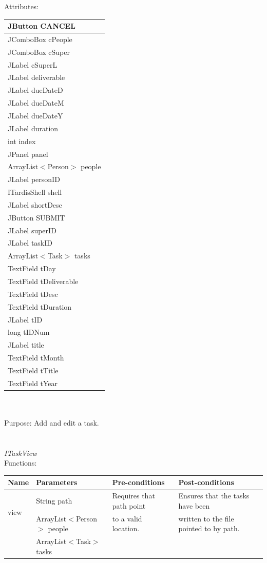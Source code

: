 Attributes:\\
\begin{tabular}{| l |}
\hline
JButton CANCEL\\
\hline
JComboBox cPeople\\
\hline
JComboBox cSuper\\
\hline
JLabel cSuperL\\
\hline
JLabel deliverable\\
\hline
JLabel dueDateD\\
\hline
JLabel dueDateM\\
\hline
JLabel dueDateY\\
\hline
JLabel duration\\
\hline
int index\\
\hline
JPanel panel\\
\hline
ArrayList$<$Person$>$ people\\
\hline
JLabel personID\\
\hline
ITardisShell shell\\
\hline
JLabel shortDesc\\
\hline
JButton SUBMIT\\
\hline
JLabel superID\\
\hline
JLabel taskID\\
\hline
ArrayList$<$Task$>$ tasks\\
\hline
TextField tDay\\
\hline
TextField tDeliverable\\
\hline
TextField tDesc\\
\hline
TextField tDuration\\
\hline
JLabel tID\\
\hline
long tIDNum\\
\hline
JLabel title\\
\hline
TextField tMonth\\
\hline
TextField tTitle\\
\hline
TextField tYear\\
\hline
\end{tabular}\\
\\
Purpose: Add and edit a task.\\
\\
\\
\emph{ITaskView}\\
Functions:\\
\begin{tabular}{| l | l | l | l |}
\hline
Name & Parameters & Pre-conditions & Post-conditions\\
\hline
\multirow{2}{*}{view} & String path                                 & Requires that path point & Ensures that the tasks have been\\ 
			 & ArrayList$<$Person$>$ people & to a valid location.          & written to the file pointed to by path.\\ 
                                     & ArrayList$<$Task$>$ tasks       &                             & 
\\
\hline
\end{tabular}\\
